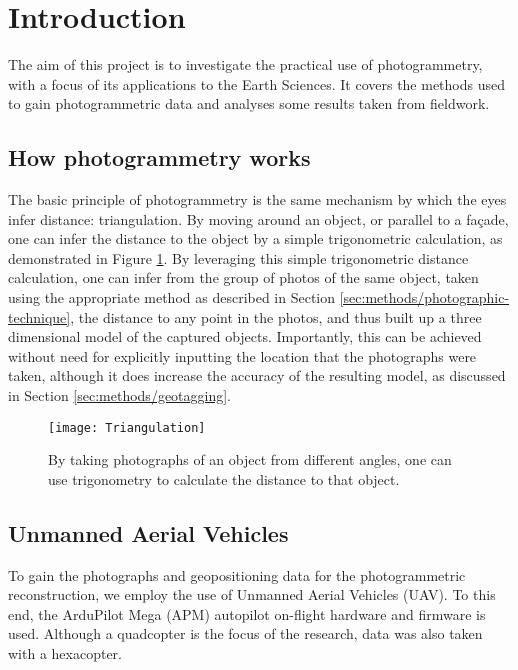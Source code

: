 \section{Introduction}

The aim of this project is to investigate the practical use of photogrammetry,
with a focus of its applications to the Earth Sciences. It covers the methods
used to gain photogrammetric data and analyses some results taken from
fieldwork.

\subsection{How photogrammetry works}

The basic principle of photogrammetry is the same mechanism by which the eyes
infer distance: triangulation. By moving around an object, or parallel to a
façade, one can infer the distance to the object by a simple trigonometric
calculation, as demonstrated in Figure \ref{fig:triangulation}. By leveraging
this simple trigonometric distance calculation, one can infer from the group of
photos of the same object, taken using the appropriate method as described in
Section \ref{sec:methods/photographic-technique}, the distance to any point in
the photos, and thus built up a three dimensional model of the captured objects.
Importantly, this can be achieved without need for explicitly inputting the
location that the photographs were taken, although it does increase the accuracy
of the resulting model, as discussed in Section \ref{sec:methods/geotagging}.

\begin{figure}
    \texttt{[image: Triangulation]}
    \caption{By taking photographs of an object from different angles, one can
        use trigonometry to calculate the distance to that object.}
    \label{fig:triangulation}
\end{figure}

\subsection{Unmanned Aerial Vehicles}

To gain the photographs and geopositioning data for the photogrammetric
reconstruction, we employ the use of Unmanned Aerial Vehicles (UAV). To this
end, the ArduPilot Mega (APM) autopilot
on-flight hardware and firmware is used.  Although a quadcopter is the focus of
the research, data was also taken with a hexacopter.

